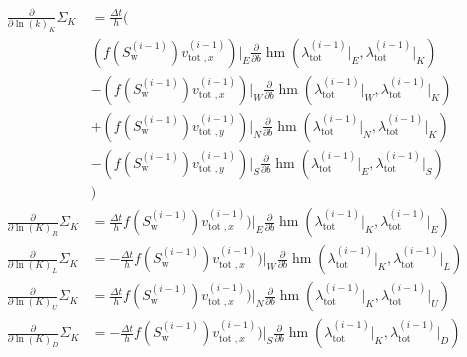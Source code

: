\documentclass[conference]{IEEEtran}
\newcommand*{\pdiff}[2]{\ensuremath{\frac{\partial}{\partial{#2}}{#1}}}
\DeclareMathOperator*{\hmean}{hm}
\begin{document}
\begin{align}
\pdiff{\Sigma_K}{\ln(k)_K} &= \frac{\Delta t}{h} \biggr(\\&(f(S_\text{w}^{(i-1)})v_{\text{tot }, x}^{(i-1)})\lvert_E\pdiff{\hmean}{b}(\lambda_\text{tot}^{(i-1)}\lvert_E, \lambda_\text{tot}^{(i-1)}\lvert_K)  \nonumber\\&- (f(S_\text{w}^{(i-1)})v_{\text{tot }, x}^{(i-1)})\lvert_W\pdiff{\hmean}{b}(\lambda_\text{tot}^{(i-1)}\lvert_W, \lambda_\text{tot}^{(i-1)}\lvert_K) \nonumber\\&+ (f(S_\text{w}^{(i-1)})v_{\text{tot }, y}^{(i-1)})\lvert_N\pdiff{\hmean}{b}(\lambda_\text{tot}^{(i-1)}\lvert_N, \lambda_\text{tot}^{(i-1)}\lvert_K) \nonumber\\&- (f(S_\text{w}^{(i-1)})v_{\text{tot }, y}^{(i-1)})\lvert_S\pdiff{\hmean}{b}(\lambda_\text{tot}^{(i-1)}\lvert_E, \lambda_\text{tot}^{(i-1)}\lvert_S)\nonumber\\&\biggr) \nonumber \\
\pdiff{\Sigma_K}{\ln(K)_R} &= \frac{\Delta t}{h} f(S_\text{w}^{(i-1)})v_{\text{tot }, x}^{(i-1)})\lvert_E\pdiff{\hmean}{b}(\lambda_\text{tot}^{(i-1)}\lvert_K, \lambda_\text{tot}^{(i-1)}\lvert_E) \\
\pdiff{\Sigma_K}{\ln(K)_L} &= -\frac{\Delta t}{h} f(S_\text{w}^{(i-1)})v_{\text{tot }, x}^{(i-1)})\lvert_W\pdiff{\hmean}{b}(\lambda_\text{tot}^{(i-1)}\lvert_K, \lambda_\text{tot}^{(i-1)}\lvert_L) \\
\pdiff{\Sigma_K}{\ln(K)_U} &= \frac{\Delta t}{h} f(S_\text{w}^{(i-1)})v_{\text{tot }, x}^{(i-1)})\lvert_N\pdiff{\hmean}{b}(\lambda_\text{tot}^{(i-1)}\lvert_K, \lambda_\text{tot}^{(i-1)}\lvert_U) \\
\pdiff{\Sigma_K}{\ln(K)_D} &= -\frac{\Delta t}{h} f(S_\text{w}^{(i-1)})v_{\text{tot }, x}^{(i-1)})\lvert_S\pdiff{\hmean}{b}(\lambda_\text{tot}^{(i-1)}\lvert_K, \lambda_\text{tot}^{(i-1)}\lvert_D)
\end{align}
%
%
\end{document}
